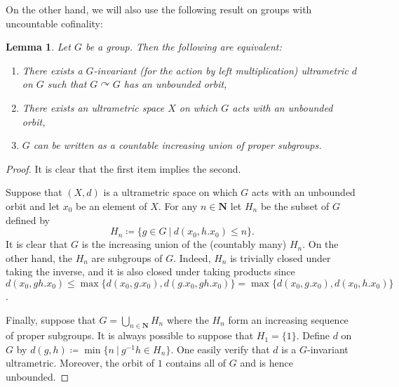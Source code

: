 \documentclass[a4paper]{article}
\newtheorem{lem}{Lemma}[section]
\theoremstyle{definition}
\theoremstyle{remark}%
\newcommand*{\field}[1]{\mathbf{#1}}
\newcommand*{\N}{\field{N}}
\newcommand{\setst}[2]{\{#1\ |\ #2\}}
\begin{document}
On the other hand, we will also use the following result on groups with uncountable cofinality:
%
%
\begin{lem}\label{Lemma:CofSub}
Let $G$ be a group. Then the following are equivalent:
\begin{enumerate}
\item There exists a $G$-invariant (for the action by left multiplication) ultrametric $d$ on $G$ such that $G\curvearrowright G$ has an unbounded orbit,
\item There exists an ultrametric space $X$ on which $G$ acts with an unbounded orbit,
\item $G$ can be written as a countable increasing union of proper subgroups.
\end{enumerate}
\end{lem}
\begin{proof}
It is clear that the first item implies the second.

Suppose that $(X,d)$ is a ultrametric space on which $G$ acts with an unbounded orbit and let $x_0$ be an element of $X$. For any $n\in \N$ let $H_n$ be the subset of $G$ defined by
\[
	H_n\coloneqq\setst{g\in G}{d(x_0,h.x_0)\leq n}.
\]
It is clear that $G$ is the increasing union of the (countably many) $H_n$.
On the other hand, the $H_n$ are subgroups of $G$. Indeed, $H_n$ is trivially closed under taking the inverse, and it is also closed under taking products since $d(x_0,gh.x_0)\leq\max\{d(x_0,g.x_0),d(g.x_0,gh.x_0)\}=\max\{d(x_0,g.x_0),d(x_0,h.x_0)\}$.

Finally, suppose that $G=\bigcup_{n\in \N}H_n$ where the $H_n$ form an increasing sequence of proper subgroups. It is always possible to suppose that $H_1=\{1\}$.
Define $d$ on $G$ by $d(g,h)\coloneqq\min\setst{n}{g^{-1}h\in H_n}$.
One easily verify that $d$ is a $G$-invariant ultrametric. Moreover, the orbit of $1$ contains all of $G$ and is hence unbounded.
\end{proof}
\end{document}
